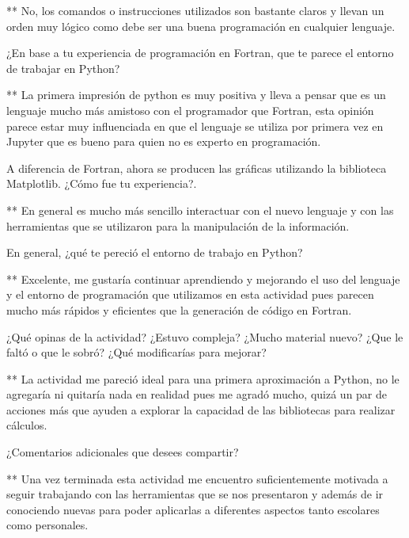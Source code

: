 \documentclass{article} %
\begin{document}
** No, los comandos o instrucciones utilizados son bastante claros y llevan un orden muy lógico como debe ser una buena programación en cualquier lenguaje. 

\vspace{0.5 cm}

¿En base a tu experiencia de programación en Fortran, que te parece el entorno de trabajar en Python?

\vspace{0.5 cm}

** La primera impresión de python es muy positiva y lleva a pensar que es un lenguaje mucho más amistoso con el programador que Fortran, esta opinión parece estar muy influenciada en que el lenguaje se utiliza por primera vez en Jupyter que es bueno para quien no es experto en programación.

\vspace{0.5 cm}

A diferencia de Fortran, ahora se producen las gráficas utilizando la biblioteca Matplotlib. ¿Cómo fue tu experiencia?. 

\vspace{0.5 cm}

** En general es mucho más sencillo interactuar con el nuevo lenguaje y con las herramientas que se utilizaron para la manipulación de la información.

\vspace{0.5 cm}

En general, ¿qué te pereció el entorno de trabajo en Python? 

\vspace{0.5 cm}

** Excelente, me gustaría continuar aprendiendo y mejorando el uso del lenguaje y el entorno de programación que utilizamos en esta actividad pues parecen mucho más rápidos y eficientes que la generación de código en Fortran.

\vspace{0.5 cm}

¿Qué opinas de la actividad? ¿Estuvo compleja? ¿Mucho material nuevo? ¿Que le faltó o que le sobró? ¿Qué modificarías para mejorar? 

\vspace{0.5 cm}

** La actividad me pareció ideal para una primera aproximación a Python, no le agregaría ni quitaría nada en realidad pues me agradó mucho, quizá un par de acciones más que ayuden a explorar la capacidad de las bibliotecas para realizar cálculos.

\vspace{0.5 cm}

¿Comentarios adicionales que desees compartir?

\vspace{0.5 cm}

** Una vez terminada esta actividad me encuentro suficientemente motivada a seguir trabajando con las herramientas que se nos presentaron y además de ir conociendo nuevas para poder aplicarlas a diferentes aspectos tanto escolares como personales. 

\vspace{0.5 cm}

 
\end{document}
